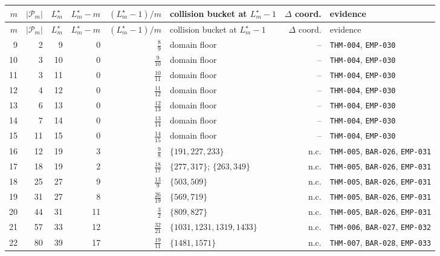 \begingroup
\scriptsize
\setlength{\tabcolsep}{3pt}
\begin{longtable}{rrrrrL{3.3cm}rL{2.5cm}}
\toprule
\(m\) & \(|\mathcal P_m|\) & \(L_m^\star\) & \(L_m^\star-m\) & \((L_m^\star-1)/m\) & collision bucket at \(L_m^\star-1\) & \(\Delta\) coord. & evidence \\
\midrule
\endfirsthead
\toprule
\(m\) & \(|\mathcal P_m|\) & \(L_m^\star\) & \(L_m^\star-m\) & \((L_m^\star-1)/m\) & collision bucket at \(L_m^\star-1\) & \(\Delta\) coord. & evidence \\
\midrule
{} & 2 & 9 & 0 & \(\frac{8}{9}\) & domain floor & -- & \texttt{THM-004}, \texttt{EMP-030} \\
10 & 3 & 10 & 0 & \(\frac{9}{10}\) & domain floor & -- & \texttt{THM-004}, \texttt{EMP-030} \\
11 & 3 & 11 & 0 & \(\frac{10}{11}\) & domain floor & -- & \texttt{THM-004}, \texttt{EMP-030} \\
12 & 4 & 12 & 0 & \(\frac{11}{12}\) & domain floor & -- & \texttt{THM-004}, \texttt{EMP-030} \\
13 & 6 & 13 & 0 & \(\frac{12}{13}\) & domain floor & -- & \texttt{THM-004}, \texttt{EMP-030} \\
14 & 7 & 14 & 0 & \(\frac{13}{14}\) & domain floor & -- & \texttt{THM-004}, \texttt{EMP-030} \\
15 & 11 & 15 & 0 & \(\frac{14}{15}\) & domain floor & -- & \texttt{THM-004}, \texttt{EMP-030} \\
16 & 12 & 19 & 3 & \(\frac{9}{8}\) & \(\{191,227,233\}\) & n.c. & \texttt{THM-005}, \texttt{BAR-026}, \texttt{EMP-031} \\
17 & 18 & 19 & 2 & \(\frac{18}{17}\) & \(\{277,317\}\); \(\{263,349\}\) & n.c. & \texttt{THM-005}, \texttt{BAR-026}, \texttt{EMP-031} \\
18 & 25 & 27 & 9 & \(\frac{13}{9}\) & \(\{503,509\}\) & n.c. & \texttt{THM-005}, \texttt{BAR-026}, \texttt{EMP-031} \\
19 & 31 & 27 & 8 & \(\frac{26}{19}\) & \(\{569,719\}\) & n.c. & \texttt{THM-005}, \texttt{BAR-026}, \texttt{EMP-031} \\
20 & 44 & 31 & 11 & \(\frac{3}{2}\) & \(\{809,827\}\) & n.c. & \texttt{THM-005}, \texttt{BAR-026}, \texttt{EMP-031} \\
21 & 57 & 33 & 12 & \(\frac{32}{21}\) & \(\{1031,1231,1319,1433\}\) & n.c. & \texttt{THM-006}, \texttt{BAR-027}, \texttt{EMP-032} \\
22 & 80 & 39 & 17 & \(\frac{19}{11}\) & \(\{1481,1571\}\) & n.c. & \texttt{THM-007}, \texttt{BAR-028}, \texttt{EMP-033} \\

\end{longtable}

